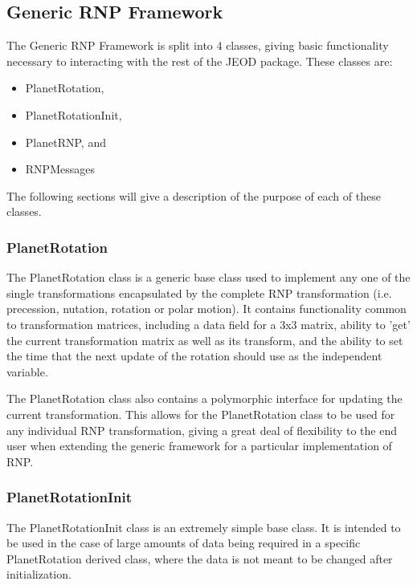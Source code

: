 \subsection{Generic RNP Framework}

The Generic RNP Framework is split into 4 classes, giving basic functionality
necessary to interacting with the rest of the JEOD package. These classes
are:

\begin{itemize}
\item{PlanetRotation}, 
\item{PlanetRotationInit}, 
\item{PlanetRNP}, and
\item{RNPMessages}
\end{itemize}

The following sections will give a description of the purpose of each of
these classes.

\subsubsection{PlanetRotation}

The PlanetRotation class is a generic base class used to implement any one
of the single transformations encapsulated by the complete RNP transformation
(i.e. precession, nutation, rotation or polar motion). It contains
functionality common to transformation matrices, including a data field
for a 3x3 matrix, ability to 'get' the current transformation matrix as well
as its transform, and the ability to set the time that the next update
of the rotation should use as the independent variable.

The PlanetRotation class also contains a polymorphic interface for updating
the current transformation. This allows for the PlanetRotation class to be
used for any individual RNP transformation, giving a great deal of flexibility
to the end user when extending the generic framework for a particular
implementation of RNP.

\subsubsection{PlanetRotationInit}

The PlanetRotationInit class is an extremely simple base class.
It is intended to be used in the case of large amounts of data being
required in a specific PlanetRotation derived class, where the data is
not meant to be changed after initialization.

